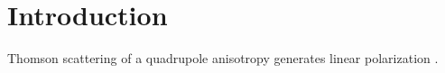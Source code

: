 \section{Introduction}
\label{s:intro}
    Thomson scattering of a quadrupole anisotropy generates linear polarization \cite{SZ97,KKS97}.
    \lipsum[1]

